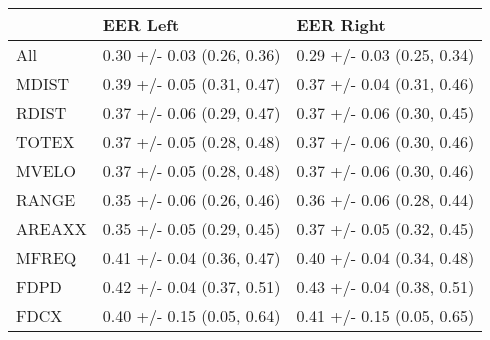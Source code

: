 \begin{tabular}{lll}
\toprule
{} &                    EER Left &                   EER Right \\
\midrule
All    &  0.30 +/- 0.03 (0.26, 0.36) &  0.29 +/- 0.03 (0.25, 0.34) \\
MDIST  &  0.39 +/- 0.05 (0.31, 0.47) &  0.37 +/- 0.04 (0.31, 0.46) \\
RDIST  &  0.37 +/- 0.06 (0.29, 0.47) &  0.37 +/- 0.06 (0.30, 0.45) \\
TOTEX  &  0.37 +/- 0.05 (0.28, 0.48) &  0.37 +/- 0.06 (0.30, 0.46) \\
MVELO  &  0.37 +/- 0.05 (0.28, 0.48) &  0.37 +/- 0.06 (0.30, 0.46) \\
RANGE  &  0.35 +/- 0.06 (0.26, 0.46) &  0.36 +/- 0.06 (0.28, 0.44) \\
AREAXX &  0.35 +/- 0.05 (0.29, 0.45) &  0.37 +/- 0.05 (0.32, 0.45) \\
MFREQ  &  0.41 +/- 0.04 (0.36, 0.47) &  0.40 +/- 0.04 (0.34, 0.48) \\
FDPD   &  0.42 +/- 0.04 (0.37, 0.51) &  0.43 +/- 0.04 (0.38, 0.51) \\
FDCX   &  0.40 +/- 0.15 (0.05, 0.64) &  0.41 +/- 0.15 (0.05, 0.65) \\
\bottomrule
\end{tabular}

